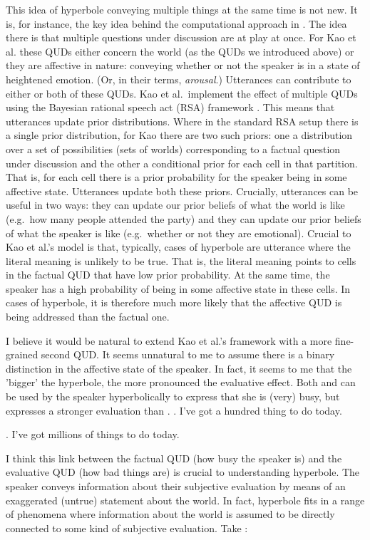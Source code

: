 \documentclass[a4paper,12pt,twoside]{article}
\begin{document}
This idea of hyperbole conveying multiple things at the same time is not new. It is, for instance, the key idea behind the computational approach in \cite{kaononliteral}. The idea there is that multiple questions under discussion are at play at once. For Kao et al. these QUDs either concern the world (as the QUDs we introduced above) or they are affective in nature: conveying whether or not the speaker is in a state of heightened emotion. (Or, in their terms, {\em arousal}.) Utterances can contribute to either or both of these QUDs. Kao et al.~implement the effect of multiple QUDs using the Bayesian rational speech act (RSA) framework \citep{goodman-frank:16,scontras_practical_2021}. This means that utterances update prior distributions. Where in the standard RSA setup there is a single prior distribution, for Kao there are two such priors: one a distribution over a set of possibilities (sets of worlds) corresponding to a factual question under discussion and the other a conditional prior for each cell in that partition. That is, for each cell there is a prior probability for the speaker being in some affective state. Utterances update both these priors. Crucially, utterances can be useful in two ways: they can update our prior beliefs of what the world is like (e.g.~how many people attended the party) and they can update our prior beliefs of what the speaker is like (e.g.~whether or not they are emotional). Crucial to Kao et al.'s model is that, typically, cases of hyperbole are utterance where the literal meaning is unlikely to be true. That is, the literal meaning points to cells in the factual QUD that have low prior probability. At the same time, the speaker has a high probability of being in some affective state in these cells. In cases of hyperbole, it is therefore much more likely that the affective QUD is being addressed than the factual one.

I believe it would be natural to extend Kao et al.'s framework with a more fine-grained second QUD. It seems unnatural to me to assume there is a binary distinction in the affective state of the speaker. In fact, it seems to me that the 'bigger' the hyperbole, the more pronounced the evaluative effect. Both \Next and \NNext can be used by the speaker hyperbolically to express that she is (very) busy, but \NNext expresses a stronger evaluation than \Next.
\ex. I've got a hundred thing to do today.

\ex. I've got millions of things to do today. 

I think this link between the factual QUD (how busy the speaker is) and the evaluative QUD (how bad things are) is crucial to understanding hyperbole. The speaker conveys information about their subjective evaluation by means of an exaggerated (untrue) statement about the world.  
In fact, hyperbole fits in a range of phenomena where information about the world is assumed to be directly connected to some kind of subjective evaluation. Take \Next:
\end{document}
